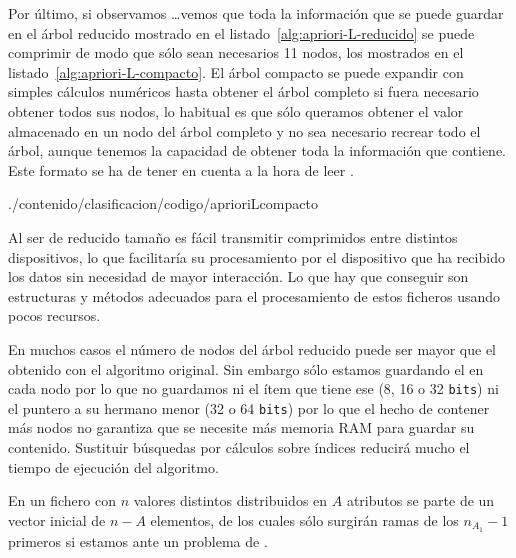 Por último, si observamos \ldots vemos que toda la información que se puede guardar en el árbol \aprioriL reducido mostrado en el listado~\ref{alg:apriori-L-reducido} se puede comprimir de modo que sólo sean necesarios 11 nodos, los mostrados en el listado~\ref{alg:apriori-L-compacto}. El árbol \aprioriL compacto se puede expandir con simples cálculos numéricos hasta obtener el árbol \aprioriL completo si fuera necesario obtener todos sus nodos, lo habitual es que sólo queramos obtener el valor almacenado en un nodo del árbol \aprioriL completo y no sea necesario recrear todo el árbol, aunque tenemos la capacidad de obtener toda la información que contiene. Este formato se ha de tener en cuenta a la hora de leer \D.

\afterpage{\clearpage}

                 {./contenido/clasificacion/codigo/aprioriLcompacto}

Al ser de reducido tamaño es fácil transmitir \catalogos comprimidos entre distintos dispositivos, lo que facilitaría su procesamiento por el dispositivo que ha recibido los datos sin necesidad de mayor interacción. Lo que hay que conseguir son estructuras y métodos adecuados para el procesamiento de estos ficheros usando pocos recursos.

En muchos casos el número de nodos del árbol reducido puede ser mayor que el obtenido con el algoritmo original. Sin embargo sólo estamos guardando el \soporte en cada nodo por lo que no guardamos ni el ítem que tiene ese \soporte (8, 16 o 32 \texttt{bits}) ni el puntero a su hermano menor (32 o 64 \texttt{bits}) por lo que el hecho de contener más nodos no garantiza que se necesite más memoria RAM para guardar su contenido. Sustituir búsquedas por cálculos sobre índices reducirá mucho el tiempo de ejecución del algoritmo.











En un fichero con $n$ valores distintos distribuidos en $A$ atributos se parte de un vector inicial de $n - A$ elementos, de los cuales sólo surgirán ramas de los $n_{A_1} - 1$ primeros si estamos ante un problema de \clasificacion.
